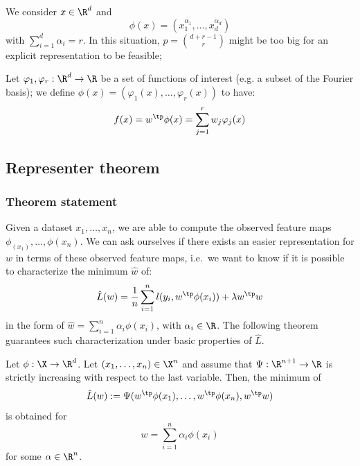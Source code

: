 \documentclass{../cs-classes/cs-classes}
\begin{document}
\begin{example}
    We consider $x\in\R^d$ and
    \begin{equation*}
        \phi(x)=(x_1^{\alpha_1}, \dots, x_d^{\alpha_d})
    \end{equation*}
    with $\sum_{i=1}^d \alpha_i=r$. In this situation, $p=\binom{d+r-1}{r}$ might be too big for an explicit representation to be feasible;
\end{example}

\begin{example}
    Let $\varphi_1, \varphi_r : \R^d \to \R$ be a set of functions of interest (e.g. a subset of the Fourier basis); we define $\phi(x) = (\varphi_1(x), \dots, \varphi_r(x))$ to have:
    \begin{equation*}
        f(x)=w^\tp \phi(x) = \sum_{j=1}^rw_j\varphi_j(x)
    \end{equation*}
\end{example}

\subsection{Representer theorem}
\subsubsection{Theorem statement}
Given a dataset $x_1, \dots, x_n$, we are able to compute the observed feature maps $\phi_(x_1), \dots, \phi(x_n)$. We can ask ourselves if there exists an easier representation for $w$ in terms of these observed feature maps, i.e.~we want to know if it is possible to characterize the minimum $\hat{w}$ of:
\begin{equation*}
    \hat{L}(w) = \frac{1}{n}\sum_{i=1}^n l(y_i, w^\tp\phi(x_i)) + \lambda w^\tp w
\end{equation*}
in the form of $\hat{w} = \sum_{i=1}^n \alpha_i\phi(x_i)$, with $\alpha_i\in\R$. The following theorem guarantees such characterization under basic properties of $\hat{L}$.

\begin{theorem}
    Let $\phi:\X\to\R^d$. Let $(x_1, \dots, x_n)\in\X^n$ and assume that $\Psi:\R^{n+1}\to\R$ is strictly increasing with respect to the last variable. Then, the minimum of
    \begin{equation*}
        \hat{L}(w) := \Psi(w^\tp\phi(x_1), \dots, w^\tp\phi(x_n), w^\tp w)
    \end{equation*}
    is obtained for
    \begin{equation*}
        w=\sum_{i=1}^n \alpha_i \phi(x_i)
    \end{equation*} for some $\alpha\in\R^n$.
\end{theorem}
\end{document}
